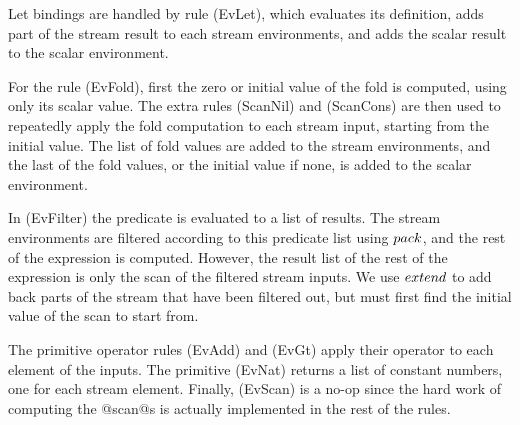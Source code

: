 Let bindings are handled by rule (EvLet), which evaluates its definition, adds part of the stream result to each stream environments, and adds the scalar result to the scalar environment.

For the rule (EvFold), first the zero or initial value of the fold is computed, using only its scalar value.
The extra rules (ScanNil) and (ScanCons) are then used to repeatedly apply the fold computation to each stream input, starting from the initial value.
The list of fold values are added to the stream environments, and the last of the fold values, or the initial value if none, is added to the scalar environment.

In (EvFilter) the predicate is evaluated to a list of results. 
The stream environments are filtered according to this predicate list using $\mit{pack}$, and the rest of the expression is computed.
However, the result list of the rest of the expression is only the scan of the filtered stream inputs.
We use $\mit{extend}$ to add back parts of the stream that have been filtered out, but must first find the initial value of the scan to start from.

The primitive operator rules (EvAdd) and (EvGt) apply their operator to each element of the inputs.
The primitive (EvNat) returns a list of constant numbers, one for each stream element.
Finally, (EvScan) is a no-op since the hard work of computing the @scan@s is actually implemented in the rest of the rules.



